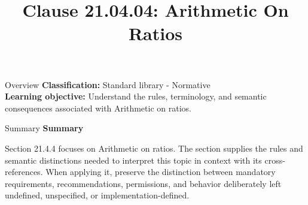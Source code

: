 \documentclass[10pt,letterpaper]{article}
\title{Clause 21.04.04: Arithmetic On Ratios}
\author{}
\date{}
\begin{document}
\maketitle
\begin{CornellOverviewBox}{Overview}
\textbf{Classification:} Standard library - Normative\\[2pt]
\textbf{Learning objective:} Understand the rules, terminology, and semantic consequences associated with Arithmetic on ratios.
\end{CornellOverviewBox}\begin{CornellSummaryBox}{Summary}
{\sffamily\bfseries\color{Accent} Summary}\par\vspace{3pt}Section 21.4.4 focuses on Arithmetic on ratios. The section supplies the rules and semantic distinctions needed to interpret this topic in context with its cross-references. When applying it, preserve the distinction between mandatory requirements, recommendations, permissions, and behavior deliberately left undefined, unspecified, or implementation-defined.
\end{CornellSummaryBox}
\end{document}
